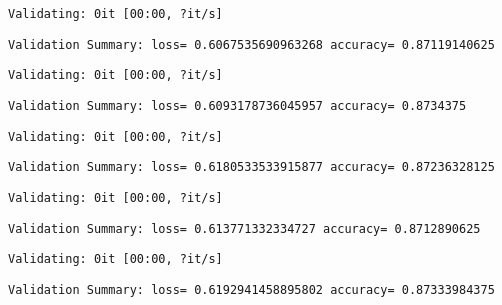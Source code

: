 \documentclass[11pt]{article}
\begin{document}
    
    \begin{Verbatim}[commandchars=\\\{\}]
Validating: 0it [00:00, ?it/s]
    \end{Verbatim}

    
    \begin{Verbatim}[commandchars=\\\{\}]
Validation Summary: loss= 0.6067535690963268 accuracy= 0.87119140625
    \end{Verbatim}

    
    \begin{Verbatim}[commandchars=\\\{\}]
Validating: 0it [00:00, ?it/s]
    \end{Verbatim}

    
    \begin{Verbatim}[commandchars=\\\{\}]
Validation Summary: loss= 0.6093178736045957 accuracy= 0.8734375
    \end{Verbatim}

    
    \begin{Verbatim}[commandchars=\\\{\}]
Validating: 0it [00:00, ?it/s]
    \end{Verbatim}

    
    \begin{Verbatim}[commandchars=\\\{\}]
Validation Summary: loss= 0.6180533533915877 accuracy= 0.87236328125
    \end{Verbatim}

    
    \begin{Verbatim}[commandchars=\\\{\}]
Validating: 0it [00:00, ?it/s]
    \end{Verbatim}

    
    \begin{Verbatim}[commandchars=\\\{\}]
Validation Summary: loss= 0.613771332334727 accuracy= 0.8712890625
    \end{Verbatim}

    
    \begin{Verbatim}[commandchars=\\\{\}]
Validating: 0it [00:00, ?it/s]
    \end{Verbatim}

    
    \begin{Verbatim}[commandchars=\\\{\}]
Validation Summary: loss= 0.6192941458895802 accuracy= 0.87333984375
    \end{Verbatim}
\end{document}
